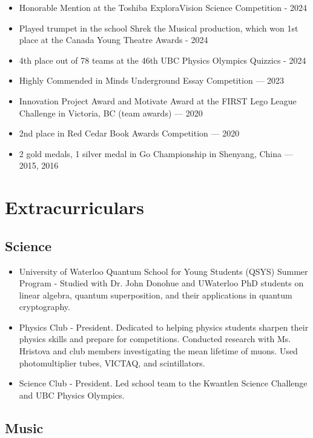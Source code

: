 \documentclass{article}
\begin{document}
\begin{itemize}
	\item Honorable Mention at the Toshiba ExploraVision Science Competition - 2024
	\item Played trumpet in the school Shrek the Musical production, which won 1st place at the Canada Young Theatre Awards - 2024
	\item 4th place out of 78 teams at the 46th UBC Physics Olympics Quizzics - 2024
	\item Highly Commended in Minds Underground Essay Competition — 2023
	\item Innovation Project Award and Motivate Award at the FIRST Lego League Challenge in Victoria, BC (team awards) — 2020
	\item 2nd place in Red Cedar Book Awards Competition — 2020
	\item 2 gold medals, 1 silver medal in Go Championship in Shenyang, China — 2015, 2016
\end{itemize}

\section*{Extracurriculars}

\subsection*{Science}

\begin{itemize}
	\item University of Waterloo Quantum School for Young Students (QSYS) Summer Program - Studied with Dr. John Donohue and UWaterloo PhD students on linear algebra, quantum superposition, and their applications in quantum cryptography.
	\item Physics Club - President. Dedicated to helping physics students sharpen their physics skills and prepare for competitions. Conducted research with Ms. Hristova and club members investigating the mean lifetime of muons. Used photomultiplier tubes, VICTAQ, and scintillators.
	\item Science Club - President. Led school team to the Kwantlen Science Challenge and UBC Physics Olympics.
\end{itemize}

\subsection*{Music}
\end{document}
